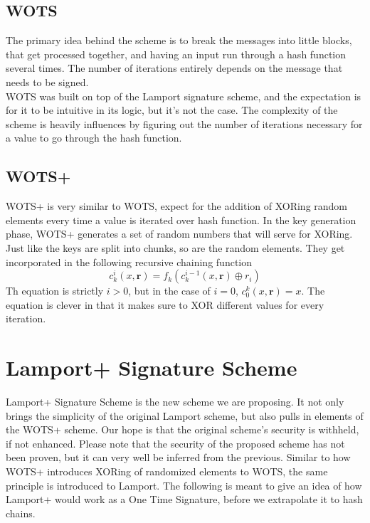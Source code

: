 \documentclass[]{scrartcl}
\begin{document}
\subsection*{WOTS}
The primary idea behind the scheme is to break the messages into little blocks, that get processed together, and having an input run through a hash function several times. The number of iterations entirely depends on the message that needs to be signed.\\
WOTS was built on top of the Lamport signature scheme, and the expectation is for it to be intuitive in its logic, but it's not the case. The complexity of the scheme is heavily influences by figuring out the number of iterations necessary for a value to go through the hash function.

\subsection*{WOTS+}
WOTS+ is very similar to WOTS, expect for the addition of XORing random elements every time a value is iterated over hash function. In the key generation phase, WOTS+ generates a set of random numbers that will serve for XORing. Just like the keys are split into chunks, so are the random elements. They get incorporated in the following recursive chaining function
\begin{equation}
c_{k}^{i}(x,\textbf{r}) = f_{k}(c_{k}^{i-1}(x,\textbf{r}) \oplus r_{i})
\end{equation}
Th equation is strictly $i > 0$, but in the case of $i = 0$, $c_{0}^{k}(x,\textbf{r}) = x$. The equation is clever in that it makes sure to XOR different values for every iteration. 

\section*{Lamport+ Signature Scheme}
Lamport+ Signature Scheme is the new scheme we are proposing. It not only brings the simplicity of the original Lamport scheme, but also pulls in elements of the WOTS+ scheme. Our hope is that the original scheme's security is withheld, if not enhanced. Please note that the security of the proposed scheme has not been proven, but it can very well be inferred from the previous. Similar to how WOTS+ introduces XORing of randomized elements to WOTS, the same principle is introduced to Lamport. The following is meant to give an idea of how Lamport+ would work as a One Time Signature, before we extrapolate it to hash chains.\\ \\
\end{document}
